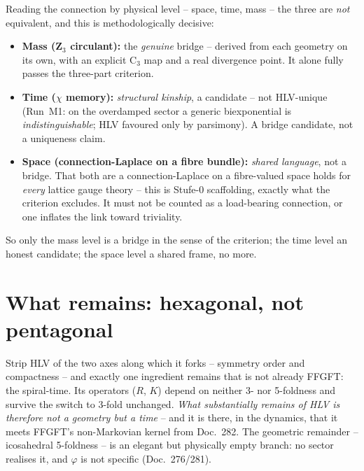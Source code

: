 \begin{important}
Reading the connection by physical level -- space, time, mass -- the three are
\emph{not} equivalent, and this is methodologically decisive:
\begin{itemize}
\item \textbf{Mass (Z$_3$ circulant):} the \emph{genuine} bridge -- derived from each
geometry on its own, with an explicit C$_3$ map and a real divergence point. It
alone fully passes the three-part criterion.
\item \textbf{Time ($\chi$ memory):} \emph{structural kinship}, a candidate -- not
HLV-unique (Run~M1: on the overdamped sector a generic biexponential is
\emph{indistinguishable}; HLV favoured only by parsimony). A bridge candidate, not a
uniqueness claim.
\item \textbf{Space (connection-Laplace on a fibre bundle):} \emph{shared language},
not a bridge. That both are a connection-Laplace on a fibre-valued space holds for
\emph{every} lattice gauge theory -- this is Stufe-0 scaffolding, exactly what the
criterion excludes. It must not be counted as a load-bearing connection, or one
inflates the link toward triviality.
\end{itemize}
So only the mass level is a bridge in the sense of the criterion; the time level an
honest candidate; the space level a shared frame, no more.
\end{important}

\section{What remains: hexagonal, not pentagonal}

Strip HLV of the two axes along which it forks -- symmetry order and compactness --
and exactly one ingredient remains that is not already FFGFT: the spiral-time. Its
operators ($R$, $K$) depend on neither 3- nor 5-foldness and survive the switch to
3-fold unchanged. \emph{What substantially remains of HLV is therefore not a geometry
but a time} -- and it is there, in the dynamics, that it meets FFGFT's non-Markovian
kernel from Doc.~282. The geometric remainder -- icosahedral 5-foldness -- is an
elegant but physically empty branch: no sector realises it, and $\varphi$ is not
specific (Doc.~276/281).


